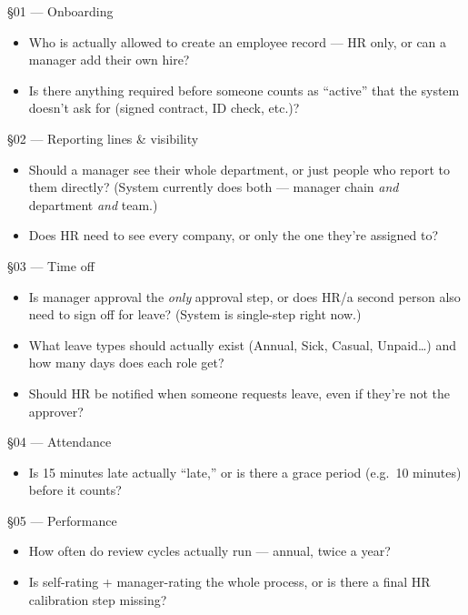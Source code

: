 \documentclass[11pt,a4paper]{article}
\newcommand{\qitem}{\item[$\square$]}
\begin{document}
\begin{questionsbox}{\S01 --- Onboarding}
\begin{itemize}[leftmargin=1.6em]
  \qitem Who is actually allowed to create an employee record --- HR only, or can a manager add their own hire?
  \qitem Is there anything required before someone counts as ``active'' that the system doesn't ask for (signed contract, ID check, etc.)?
\end{itemize}
\end{questionsbox}

\begin{questionsbox}{\S02 --- Reporting lines \& visibility}
\begin{itemize}[leftmargin=1.6em]
  \qitem Should a manager see their whole department, or just people who report to them directly? (System currently does both --- manager chain \emph{and} department \emph{and} team.)
  \qitem Does HR need to see every company, or only the one they're assigned to?
\end{itemize}
\end{questionsbox}

\begin{questionsbox}{\S03 --- Time off}
\begin{itemize}[leftmargin=1.6em]
  \qitem Is manager approval the \emph{only} approval step, or does HR/a second person also need to sign off for leave? (System is single-step right now.)
  \qitem What leave types should actually exist (Annual, Sick, Casual, Unpaid\ldots) and how many days does each role get?
  \qitem Should HR be notified when someone requests leave, even if they're not the approver?
\end{itemize}
\end{questionsbox}

\begin{questionsbox}{\S04 --- Attendance}
\begin{itemize}[leftmargin=1.6em]
  \qitem Is 15 minutes late actually ``late,'' or is there a grace period (e.g.\ 10 minutes) before it counts?
\end{itemize}
\end{questionsbox}

\begin{questionsbox}{\S05 --- Performance}
\begin{itemize}[leftmargin=1.6em]
  \qitem How often do review cycles actually run --- annual, twice a year?
  \qitem Is self-rating + manager-rating the whole process, or is there a final HR calibration step missing?
\end{itemize}
\end{questionsbox}
\end{document}
